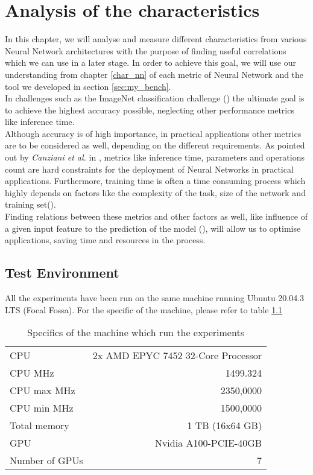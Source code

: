 \chapter{Analysis of the characteristics}\label{ana_char}
In this chapter, we will analyse and measure different characteristics from various Neural Network architectures with the purpose of finding useful correlations which we can use in a later stage. In order to achieve this goal, we will use our understanding from chapter \ref{char_nn} of each metric of Neural Network and the tool we developed in section \ref{sec:my_bench}. \\
In challenges such as the ImageNet classification challenge (\cite{ILSVRC15}) the ultimate goal is to achieve the highest accuracy possible, neglecting other performance metrics like inference time. \cite{DBLP:journals/corr/CanzianiPC16}\\
Although accuracy is of high importance, in practical applications other metrics are to be considered as well, depending on the different requirements. As pointed out by \textit{Canziani et al.} in \cite{DBLP:journals/corr/CanzianiPC16}, metrics like inference time, parameters and operations count are hard constraints
for the deployment of Neural Networks in practical applications. Furthermore, training time is often a time consuming process which highly depends on factors like the complexity of the task, size of the network and training set(\cite{118273}). \\
Finding relations between these metrics and other factors as well, like influence of a given input feature to the prediction of the model (\cite{hooker2019benchmark}), will allow us to optimise applications, saving time and resources in the process.
\section{Test Environment}
All the experiments have been run on the same machine running Ubuntu 20.04.3 LTS (Focal Fossa). For the specific of the machine, please refer to table \ref{tab:gpu_info}
\begin{table}[h]
\centering
\begin{tabular}{|l  |r|}
 \hline
CPU & 2x AMD EPYC 7452 32-Core Processor\\
CPU MHz&                     1499.324\\
CPU max MHz&                     2350,0000\\
CPU min MHz&                     1500,0000\\
Total memory&       1 TB (16x64 GB)\\
GPU&    Nvidia A100-PCIE-40GB\\
Number of GPUs & 7\\
\hline
\end{tabular}
\caption{Specifics of the machine which run the experiments}
\label{tab:gpu_info}
\end{table}

